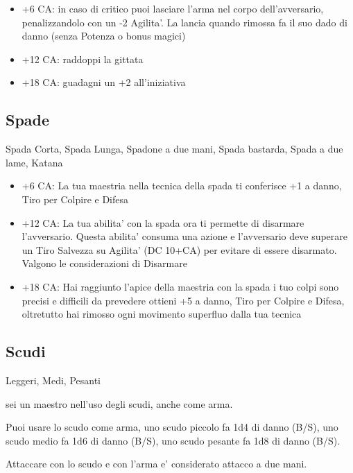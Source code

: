\documentclass[a4paper,11pt,twoside,openany]{book}
\begin{document}
\begin{itemize}

\item +6 CA: in caso di critico puoi lasciare l'arma nel corpo dell'avversario,
penalizzandolo con un -2 Agilita'. La lancia quando rimossa fa il suo dado di danno (senza
Potenza o bonus magici)

\item +12 CA: raddoppi la gittata

\item +18 CA: guadagni un +2 all'iniziativa
\end{itemize}

\subsection{Spade} Spada Corta, Spada Lunga, Spadone a due mani, Spada bastarda, Spada a due lame, Katana

\begin{itemize}

\item +6 CA: La tua maestria nella tecnica della spada ti conferisce +1
a danno, Tiro per Colpire e Difesa

\item +12 CA: La tua abilita' con la spada ora ti permette di disarmare l'avversario. Questa abilita' consuma una azione e l'avversario deve superare un Tiro Salvezza su Agilita' (DC 10+CA) per evitare di essere disarmato. Valgono le considerazioni di Disarmare

\item +18 CA: Hai raggiunto l'apice della maestria con la spada i tuo colpi sono precisi e difficili da prevedere ottieni +5 a danno, Tiro per Colpire e Difesa, oltretutto hai rimosso ogni movimento superfluo dalla tua tecnica
\end{itemize}

\subsection{Scudi} Leggeri, Medi, Pesanti

sei un maestro nell'uso degli scudi, anche come arma.

Puoi usare lo scudo come arma, uno scudo piccolo fa 1d4 di danno (B/S), uno scudo medio fa 1d6 di danno (B/S), uno scudo pesante fa 1d8 di danno (B/S).

Attaccare con lo scudo e con l'arma e' considerato attacco a due mani.
\end{document}
